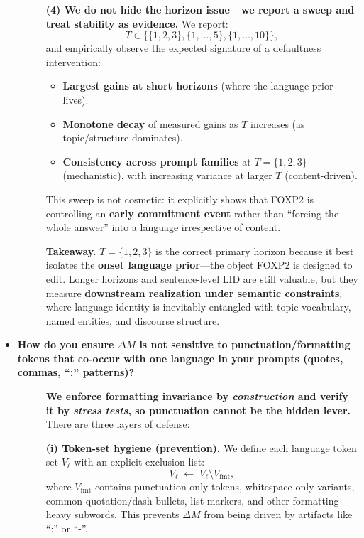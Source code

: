 \begin{itemize}[leftmargin=1.5em]
\begin{description}
\vspace{6pt}
\textbf{(4) We do not hide the horizon issue—we report a sweep and treat stability as evidence.}
We report:
\[
T\in\{\{1,2,3\},\{1,\dots,5\},\{1,\dots,10\}\},
\]
and empirically observe the expected signature of a defaultness intervention:
\begin{itemize}[leftmargin=*,itemsep=2pt]
\item \textbf{Largest gains at short horizons} (where the language prior lives).
\item \textbf{Monotone decay} of measured gains as $T$ increases (as topic/structure dominates).
\item \textbf{Consistency across prompt families} at $T=\{1,2,3\}$ (mechanistic), with increasing variance at larger $T$ (content-driven).
\end{itemize}
This sweep is not cosmetic: it explicitly shows that FOXP2 is controlling an \textbf{early commitment event} rather than “forcing the whole answer” into a language irrespective of content.

\vspace{6pt}
\textbf{Takeaway.} $T=\{1,2,3\}$ is the correct primary horizon because it best isolates the \textbf{onset language prior}—the object FOXP2 is designed to edit. Longer horizons and sentence-level LID are still valuable, but they measure \textbf{downstream realization under semantic constraints}, where language identity is inevitably entangled with topic vocabulary, named entities, and discourse structure.
\end{description}


\item[\ding{93}] \textbf{How do you ensure $\Delta M$ is not sensitive to punctuation/formatting tokens that co-occur with one language in your prompts (quotes, commas, “:” patterns)?}
\begin{description}
\item[] \textbf{We enforce formatting invariance by \emph{construction} and verify it by \emph{stress tests}, so punctuation cannot be the hidden lever.}
There are three layers of defense:

\vspace{2pt}
\textbf{(i) Token-set hygiene (prevention).}
We define each language token set $V_\ell$ with an explicit exclusion list:
\[
V_\ell \;\leftarrow\; V_\ell \setminus V_{\mathrm{fmt}},
\]
where $V_{\mathrm{fmt}}$ contains punctuation-only tokens, whitespace-only variants, common quotation/dash bullets, list markers, and other formatting-heavy subwords. This prevents $\Delta M$ from being driven by artifacts like “:” or “-”.


\end{description}
\end{itemize}
